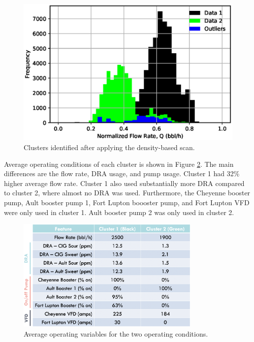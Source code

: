 \begin{figure}[h]
    \centering
    \includegraphics[scale=0.8]{images/08DBSCAN.eps}
    \caption{Clusters identified after applying the density-based scan.}
    \label{fig:08DBSCAN}
\end{figure}

Average operating conditions of each cluster is shown in Figure \ref{fig:08cluster_variables}. The main differences are the flow rate, DRA usage, and pump usage.  Cluster 1 had 32\% higher average flow rate.  Cluster 1 also used substantially more DRA compared to cluster 2, where almost no DRA was used. Furthermore, the Cheyenne booster pump, Ault booster pump 1, Fort Lupton boooster pump, and Fort Lupton VFD were only used in cluster 1.  Ault booster pump 2 was only used in cluster 2.
\begin{figure}
    \centering
    \includegraphics[width=0.8\textwidth]{images/08AvgChar.png}
    \caption{Average operating variables for the two operating conditions.}
    \label{fig:08cluster_variables}
\end{figure}

